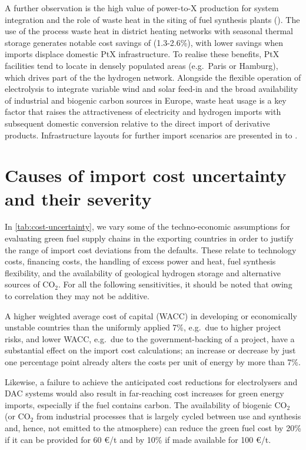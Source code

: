 
A further observation is the high value of power-to-X production for system
integration and the role of waste heat in the siting of fuel synthesis plants
(). The use of the process waste heat in district
heating networks with seasonal thermal storage generates notable cost savings of
 (1.3-2.6\%), with lower savings when imports displace domestic
PtX infrastructure. To realise these benefits, PtX facilities tend to locate in
densely populated areas (e.g.~Paris or Hamburg), which drives part of the the
hydrogen network. Alongside the flexible operation of electrolysis to integrate
variable wind and solar feed-in and the broad availability of industrial and
biogenic carbon sources in Europe, waste heat usage is a key factor that raises
the attractiveness of electricity and hydrogen imports with subsequent domestic
conversion relative to the direct import of derivative products. Infrastructure
layouts for further import scenarios are presented in 
to .

\section*{Causes of import cost uncertainty and their severity}

In \cref{tab:cost-uncertainty}, we vary some of the techno-economic assumptions
for evaluating green fuel supply chains in the exporting countries in order to
justify the range of import cost deviations from the defaults. These relate to
technology costs, financing costs, the handling of excess power and heat, fuel
synthesis flexibility, and the availability of geological hydrogen storage and
alternative sources of CO$_2$. For all the following sensitivities, it should be
noted that owing to correlation they may not be additive.

A higher weighted average cost of capital (WACC) in developing or economically
unstable countries than the uniformly applied 7\%, e.g.~due to higher project
risks, and lower WACC, e.g.~due to the government-backing of a project, have a
substantial effect on the import cost calculations; an increase or decrease by
just one percentage point already alters the costs per unit of energy by more
than
7\%.\cite{egliBiasEnergy2019,bogdanovReplyBias2019,lonerganImprovingRepresentation2023a,schyskaHowRegional2020,steffenDeterminantsCost2022}

Likewise, a failure to achieve the anticipated cost reductions for electrolysers
and DAC systems would also result in far-reaching cost increases for green
energy imports, especially if the fuel contains carbon. The availability of
biogenic CO$_2$ (or CO$_2$ from industrial processes that is largely cycled
between use and synthesis and, hence, not emitted to the atmosphere) can reduce
the green fuel cost by 20\% if it can be provided for 60 \euro{}/t and by 10\%
if made available for 100 \euro{}/t.

